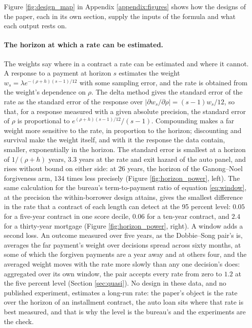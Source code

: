 Figure \ref{fig:design_map} in Appendix \ref{appendix:figures} shows how the designs of the paper, each in its own section, supply the inputs of the formula and what each output rests on.

\paragraph{The horizon at which a rate can be estimated.} The weights say where in a contract a rate can be estimated and where it cannot. A response to a payment at horizon $s$ estimates the weight $w_s = \lambda e^{-(\rho + h)(s-1)/12}$ with some sampling error, and the rate is obtained from the weight's dependence on $\rho$. The delta method gives the standard error of the rate as the standard error of the response over $|\partial w_s/\partial \rho| = (s-1) w_s/12$, so that, for a response measured with a given absolute precision, the standard error of $\rho$ is proportional to $e^{(\rho + h)(s-1)/12}/(s-1)$. Compounding makes a far weight more sensitive to the rate, in proportion to the horizon; discounting and survival make the weight itself, and with it the response the data contain, smaller, exponentially in the horizon. The standard error is smallest at a horizon of $1/(\rho + h)$ years, $3.3$ years at the rate and exit hazard of the auto panel, and rises without bound on either side: at 26 years, the horizon of the Ganong--Noel forgiveness arm, $134$ times less precisely (Figure \ref{fig:horizon_power}, left). The same calculation for the bureau's term-to-payment ratio of equation \eqref{eq:window}, at the precision the within-borrower design attains, gives the smallest difference in the rate that a contract of each length can detect at the 95 percent level: $0.05$ for a five-year contract in one score decile, $0.06$ for a ten-year contract, and $2.4$ for a thirty-year mortgage (Figure \ref{fig:horizon_power}, right). A window adds a second loss. An outcome measured over five years, as the Dobbie--Song pair's is, averages the far payment's weight over decisions spread across sixty months, at some of which the forgiven payments are a year away and at others four, and the averaged weight moves with the rate more slowly than any one decision's does: aggregated over its own window, the pair accepts every rate from zero to $1.2$ at the five percent level (Section \ref{sec:quasi}). No design in these data, and no published experiment, estimates a long-run rate: the paper's object is the rate over the horizon of an installment contract, the auto loan sits where that rate is best measured, and that is why the level is the bureau's and the experiments are the check.

